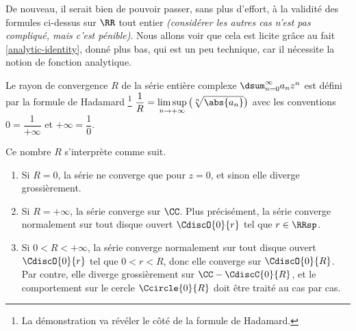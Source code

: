 De nouveau, il serait bien de pouvoir passer, sans plus d'effort, à la validité des formules ci-dessus sur $\RR$ tout entier \emph{(considérer les autres cas n'est pas compliqué, mais c'est pénible)}.
%
Nous allons voir que cela est licite grâce au fait \ref{analytic-identity}, donné plus bas, qui est un peu technique, car il nécessite la notion de fonction analytique.




\begin{preli} \label{XXX}
    Le rayon de convergence $R$ de la série entière complexe $\dsum_{n=0}^{\infty} a_n z^n$ est défini par la formule de Hadamard%
    \footnote{
    	La démonstration va révéler le côté  de la formule de Hadamard.
    }
    $\displaystyle \frac{1}{R} = \limsup_{n \to +\infty} \big( \sqrt[n]{\abs{a_n}} \big)$
    avec les conventions
    $0 = \dfrac{1}{+\infty}$
    et
    $+\infty = \dfrac{1}{0}$.

    \smallskip
    
    Ce nombre $R$ s'interprète comme suit.
    \begin{enumerate}
        \item Si $R = 0$, la série ne converge que pour $z = 0$, et sinon elle diverge grossièrement.

        \item Si $R = +\infty$, la série converge sur $\CC$.
        Plus précisément, la série converge normalement sur tout disque ouvert $\CdiscO{0}{r}$ tel que $r \in \RRsp$. 

        \item Si $0 < R < +\infty$, la série converge normalement sur tout disque ouvert $\CdiscO{0}{r}$ tel que $0 < r < R$, donc elle converge sur $\CdiscO{0}{R}$.
        Par contre, elle diverge grossièrement sur $\CC - \CdiscC{0}{R}$,
        et
        le comportement sur le cercle $\Ccircle{0}{R}$ doit être traité au cas par cas.
    \end{enumerate}
\end{preli}


